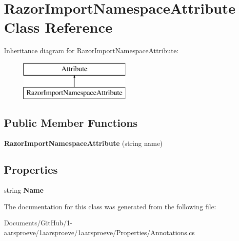 \hypertarget{class_razor_import_namespace_attribute}{}\section{Razor\+Import\+Namespace\+Attribute Class Reference}
\label{class_razor_import_namespace_attribute}
Inheritance diagram for Razor\+Import\+Namespace\+Attribute\+:\begin{figure}[H]
\begin{center}
\leavevmode
\includegraphics[height=2.000000cm]{class_razor_import_namespace_attribute}
\end{center}
\end{figure}
\subsection*{Public Member Functions}
\begin{DoxyCompactItemize}
\item 
\hypertarget{class_razor_import_namespace_attribute_ab0da268448da74efb48a051a661ecb1e}{}{\bfseries Razor\+Import\+Namespace\+Attribute} (string name)\label{class_razor_import_namespace_attribute_ab0da268448da74efb48a051a661ecb1e}

\end{DoxyCompactItemize}
\subsection*{Properties}
\begin{DoxyCompactItemize}
\item 
\hypertarget{class_razor_import_namespace_attribute_a9416e58cf9013104dd4d22007c417a89}{}string {\bfseries Name}\label{class_razor_import_namespace_attribute_a9416e58cf9013104dd4d22007c417a89}

\end{DoxyCompactItemize}


The documentation for this class was generated from the following file\+:\begin{DoxyCompactItemize}
\item 
Documents/\+Git\+Hub/1-\/aarsproeve/1aarsproeve/1aarsproeve/\+Properties/Annotations.\+cs\end{DoxyCompactItemize}

